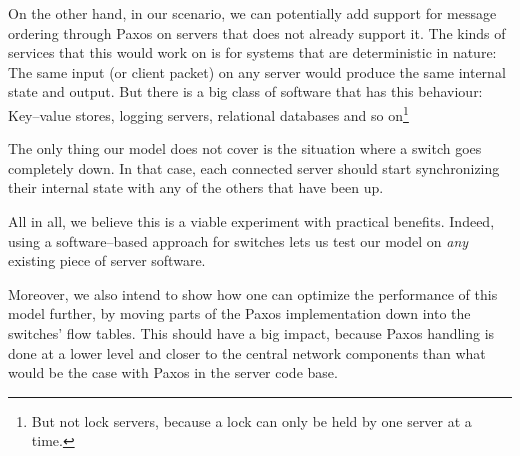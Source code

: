 On the other hand, in our scenario, we can potentially add support for
message ordering through Paxos on servers that does not already support it.
The kinds of services that this would work on is for systems that are
deterministic in nature: The same input (or client packet) on any server
would produce the same internal state and output.
%
But there is a big class of software that has this behaviour:  Key--value
stores, logging servers, relational databases and so on\footnote{But not
lock servers, because a lock can only be held by one server at a time.}

The only thing our model does not cover is the situation where a switch goes
completely down.  In that case, each connected server should start
synchronizing their internal state with any of the others that have been up.

All in all, we believe this is a viable experiment with practical benefits.
Indeed, using a software--based approach for switches lets us test our model
on \textit{any} existing piece of server software.

Moreover, we also intend to show how one can optimize the performance of
this model further, by moving parts of the Paxos implementation down into
the switches' flow tables.  This should have a big impact, because Paxos
handling is done at a lower level and closer to the central network
components than what would be the case with Paxos in the server code base.

